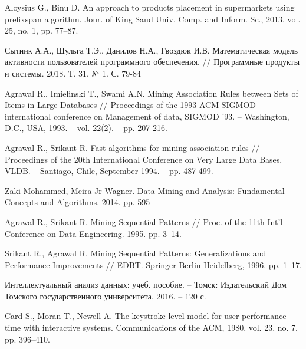 \begin{thebibliography}{1}
	Aloysius G., Binu D.
	An approach to products placement in supermarkets using prefixspan algorithm.
	Jour. of King Saud Univ. Comp. and Inform. Sc., 2013, vol. 25, no. 1, pp. 77–87.
	
	Сытник А.А., Шульга Т.Э., Данилов Н.А., Гвоздюк И.В.
	Математическая модель активности пользователей программного обеспечения.
	// Программные продукты и системы. 2018. Т. 31. № 1. С. 79-84 
	
	Agrawal R., Imielinski T., Swami A.N.
	Mining Association Rules between Sets of Items in Large Databases
	// Proceedings of the 1993 ACM SIGMOD international conference on Management of data, SIGMOD '93. – Washington, D.C., USA, 1993. – vol. 22(2). – pp. 207-216.
	
	Agrawal R., Srikant R.
	Fast algorithms for mining association rules
	// Proceedings of the 20th International Conference on Very Large Data Bases, VLDB. – Santiago, Chile, September 1994. – pp. 487-499.
	
	Zaki Mohammed, Meira Jr Wagner. Data Mining and Analysis: Fundamental Concepts and Algorithms. 2014. pp. 595
	
	Agrawal R., Srikant R. Mining Sequential Patterns // Proc. of the 11th Int’l
	Conference on Data Engineering. 1995. pp. 3–14.
	
	Srikant R., Agrawal R. Mining Sequential Patterns: Generalizations and
	Performance Improvements // EDBT. Springer Berlin Heidelberg, 1996.
	pp. 1–17.
	
	Интеллектуальный анализ данных: учеб. пособие. --
	Томск: Издательский Дом Томского государственного
	университета, 2016. -- 120 с.
	
	Card S., Moran T., Newell A.
	The keystroke-level model for user performance time with interactive systems.
	Communications of the ACM, 1980, vol. 23, no. 7, pp. 396–410.
	
	
\end{thebibliography}
